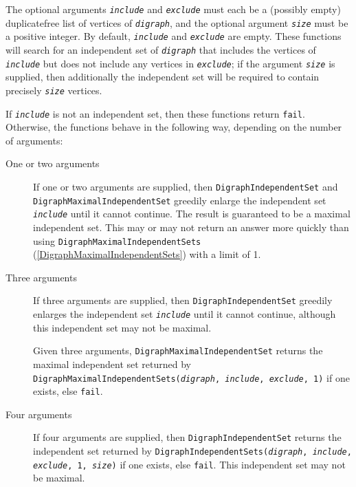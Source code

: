 \documentclass[a4paper,11pt]{report}
\begin{document}
{{{ The optional arguments \mbox{\texttt{\mdseries\slshape include}} and \mbox{\texttt{\mdseries\slshape exclude}} must each be a (possibly empty) duplicate\texttt{}free list of
vertices of \mbox{\texttt{\mdseries\slshape digraph}}, and the optional argument \mbox{\texttt{\mdseries\slshape size}} must be a positive integer. By default, \mbox{\texttt{\mdseries\slshape include}} and \mbox{\texttt{\mdseries\slshape exclude}} are empty. These functions will search for an independent set of \mbox{\texttt{\mdseries\slshape digraph}} that includes the vertices of \mbox{\texttt{\mdseries\slshape include}} but does not include any vertices in \mbox{\texttt{\mdseries\slshape exclude}}; if the argument \mbox{\texttt{\mdseries\slshape size}} is supplied, then additionally the independent set will be required to contain
precisely \mbox{\texttt{\mdseries\slshape size}} vertices.

 If \mbox{\texttt{\mdseries\slshape include}} is not an independent set, then these functions return \texttt{fail}. Otherwise, the functions behave in the following way, depending on the
number of arguments: 
\begin{description}
\item[{One or two arguments}]  If one or two arguments are supplied, then \texttt{DigraphIndependentSet} and \texttt{DigraphMaximalIndependentSet} greedily enlarge the independent set \mbox{\texttt{\mdseries\slshape include}} until it cannot continue. The result is guaranteed to be a maximal independent
set. This may or may not return an answer more quickly than using \texttt{DigraphMaximalIndependentSets} (\ref{DigraphMaximalIndependentSets}) with a limit of 1. 
\item[{Three arguments}]  If three arguments are supplied, then \texttt{DigraphIndependentSet} greedily enlarges the independent set \mbox{\texttt{\mdseries\slshape include}} until it cannot continue, although this independent set may not be maximal.

 Given three arguments, \texttt{DigraphMaximalIndependentSet} returns the maximal independent set returned by \texttt{DigraphMaximalIndependentSets(}\mbox{\texttt{\mdseries\slshape digraph}}\texttt{, }\mbox{\texttt{\mdseries\slshape include}}\texttt{, }\mbox{\texttt{\mdseries\slshape exclude}}\texttt{, 1)} if one exists, else \texttt{fail}. 
\item[{Four arguments}]  If four arguments are supplied, then \texttt{DigraphIndependentSet} returns the independent set returned by \texttt{DigraphIndependentSets(}\mbox{\texttt{\mdseries\slshape digraph}}\texttt{, }\mbox{\texttt{\mdseries\slshape include}}\texttt{, }\mbox{\texttt{\mdseries\slshape exclude}}\texttt{, 1, }\mbox{\texttt{\mdseries\slshape size}}\texttt{)} if one exists, else \texttt{fail}. This independent set may not be maximal.


\end{description}}}}
\end{document}
